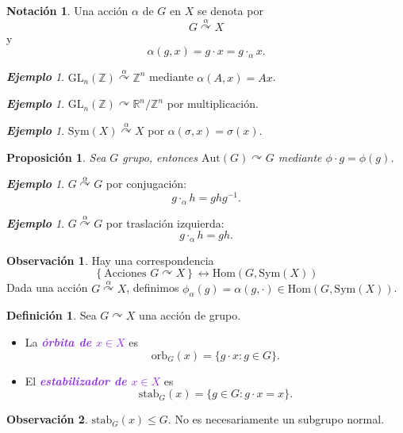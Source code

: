 \documentclass{article}
\newtheorem{proposition}[theorem]{Proposición}
\theoremstyle{definition}
\newtheorem{definition}[theorem]{Definición}
\newtheorem*{notation}{Notación}
\newtheorem*{obs}{Observación}
\theoremstyle{remark}
\newtheorem{example}[theorem]{\textbf{Ejemplo}}
\numberwithin{equation}{section}
\newcommand{\R}{\mathbb{R}}
\newcommand{\Z}{\mathbb{Z}}
\newcommand{\acts}{\curvearrowright}
\newcommand{\actsby}[1]{\stackrel{#1}{\acts}}
\renewcommand{\c}{\cdot}
\newcommand{\orb}{\mathrm{orb}}
\newcommand{\GL}{\mathrm{GL}}
\newcommand{\Sym}{\mathrm{Sym}}
\newcommand{\Aut}{\mathrm{Aut}}
\newcommand{\Hom}{\mathrm{Hom}}
\newcommand{\stab}{\mathrm{stab}}
\newcommand{\set}[1]{\left\{ #1 \right\}}
\newcommand{\wea}[1]{\textcolor{BlueViolet}{\textbf{\emph{#1}}}}
\begin{document}
\begin{notation}
  Una acción $\alpha$ de $G$ en $X$ se denota por $$G \actsby{\alpha} X$$ y $$\alpha(g,x) = g \c x = g \c_\alpha x.$$
\end{notation}

\begin{example}
  $\GL_n(\Z) \actsby\alpha \Z^n$ mediante $\alpha(A,x) = Ax$.
\end{example}

\begin{example}
  $\GL_n(\Z) \acts \R^n/\Z^n$ por multiplicación.
\end{example}

\begin{example}
  $\Sym(X) \actsby\alpha X$ por $\alpha(\sigma,x) = \sigma(x)$.
\end{example}

\begin{proposition}
  Sea $G$ grupo, entonces $\Aut(G) \acts G$ mediante $\phi \c g = \phi(g)$.
\end{proposition}

\begin{example}
  $G \actsby\alpha G$ por conjugación: $$g \c_\alpha h = ghg^{-1}.$$
\end{example}

\begin{example}
  $G \actsby\alpha G$ por traslación izquierda: $$g \c_\alpha h = gh.$$
\end{example}

\begin{obs}
  Hay una correspondencia
  \[
  \set{\text{Acciones $G \acts X$}} \leftrightarrow \Hom(G,\Sym(X))
  \]
  Dada una acción $G \actsby\alpha X$, definimos $\phi_\alpha(g) = \alpha(g,\c) \in \Hom(G,\Sym(X))$.
\end{obs}

\begin{definition}
  Sea $G \acts X$ una acción de grupo.
  \begin{itemize}
    \item La \wea{órbita de $x \in X$} es $$\orb_G(x) = \{g \c x \colon g \in G\}.$$
    \item El \wea{estabilizador de $x \in X$} es $$\stab_G(x) = \{g \in G \colon g \c x = x\}.$$
  \end{itemize}
\end{definition}

\begin{obs}
  $\stab_G(x) \leqslant G$. No es necesariamente un subgrupo normal. %
\end{obs}
\end{document}
